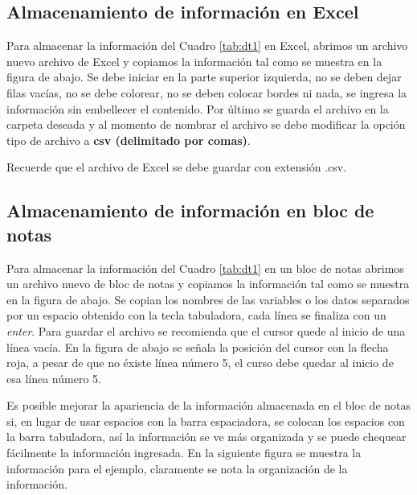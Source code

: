 \documentclass[
]{book}
\makeatletter
\newenvironment{kframe}{%
\medskip{}
\setlength{\fboxsep}{.8em}
 \def\at@end@of@kframe{}%
 \ifinner\ifhmode%
  \def\at@end@of@kframe{\end{minipage}}%
  \begin{minipage}{\columnwidth}%
 \fi\fi%
 \def\FrameCommand##1{\hskip\@totalleftmargin \hskip-\fboxsep
 \colorbox{shadecolor}{##1}\hskip-\fboxsep
     \hskip-\linewidth \hskip-\@totalleftmargin \hskip\columnwidth}%
 \MakeFramed {\advance\hsize-\width
   \@totalleftmargin\z@ \linewidth\hsize
   \@setminipage}}%
 {\par\unskip\endMakeFramed%
 \at@end@of@kframe}
\newenvironment{rmdblock}[1]
  {
  \begin{itemize}
  \renewcommand{\labelitemi}{
    \raisebox{-.7\height}[0pt][0pt]{
      {\setkeys{Gin}{width=3em,keepaspectratio}\texttt{[image: images/\#1]}}
    }
  }
  \setlength{\fboxsep}{1em}
  \begin{kframe}
  \item
  }
  {
  \end{kframe}
  \end{itemize}
  }
\newenvironment{rmdwarning}
  {\begin{rmdblock}{warning}}
  {\end{rmdblock}}
\makeatother
\begin{document}
\hypertarget{almacenamiento-de-informaciuxf3n-en-excel}{%
\subsection{Almacenamiento de información en Excel}\label{almacenamiento-de-informaciuxf3n-en-excel}}

Para almacenar la información del Cuadro \ref{tab:dt1} en Excel, abrimos un archivo nuevo archivo de Excel y copiamos la información tal como se muestra en la figura de abajo. Se debe iniciar en la parte superior izquierda, no se deben dejar filas vacías, no se debe colorear, no se deben colocar bordes ni nada, se ingresa la información sin embellecer el contenido. Por último se guarda el archivo en la carpeta deseada y al momento de nombrar el archivo se debe modificar la opción tipo de archivo a \textbf{csv (delimitado por comas)}.

\begin{rmdwarning}
Recuerde que el archivo de Excel se debe guardar con extensión .csv.
\end{rmdwarning}

\hypertarget{almacenamiento-de-informaciuxf3n-en-bloc-de-notas}{%
\subsection{Almacenamiento de información en bloc de notas}\label{almacenamiento-de-informaciuxf3n-en-bloc-de-notas}}

Para almacenar la información del Cuadro \ref{tab:dt1} en un bloc de notas abrimos un archivo nuevo de bloc de notas y copiamos la información tal como se muestra en la figura de abajo. Se copian los nombres de las variables o los datos separados por un espacio obtenido con la tecla tabuladora, cada línea se finaliza con un \emph{enter}. Para guardar el archivo se recomienda que el cursor quede al inicio de una línea vacía. En la figura de abajo se señala la posición del cursor con la flecha roja, a pesar de que no éxiste línea número 5, el curso debe quedar al inicio de esa línea número 5.

Es posible mejorar la apariencia de la información almacenada en el bloc de notas si, en lugar de usar espacios con la barra espaciadora, se colocan los espacios con la barra tabuladora, así la información se ve más organizada y se puede chequear fácilmente la información ingresada. En la siguiente figura se muestra la información para el ejemplo, claramente se nota la organización de la información.
\end{document}
